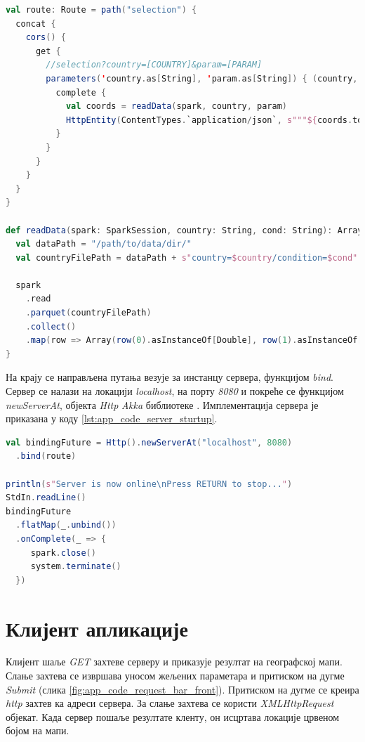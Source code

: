 \documentclass[12pt,oneside]{memoir}
\begin{document}
\begin{lstlisting}[caption={Имплементација функције која прима и обрађује \textit{GET} захтев}, language=Scala, label={lst:app_code_create_get}]
val route: Route = path("selection") {
  concat {
    cors() {
      get {
        //selection?country=[COUNTRY]&param=[PARAM]
        parameters('country.as[String], 'param.as[String]) { (country, param) =>
          complete {
            val coords = readData(spark, country, param)
            HttpEntity(ContentTypes.`application/json`, s"""${coords.toJson}""")
          }
        }
      }
    }
  }
}

def readData(spark: SparkSession, country: String, cond: String): Array[Array[Double]] = {
  val dataPath = "/path/to/data/dir/"
  val countryFilePath = dataPath + s"country=$country/condition=$cond"

  spark
    .read
    .parquet(countryFilePath)
    .collect()
    .map(row => Array(row(0).asInstanceOf[Double], row(1).asInstanceOf[Double]))
}
\end{lstlisting}

На крају се направљена путања везује за инстанцу сервера, функцијом \textit{bind}. Сервер се налази на локацији \textit{localhost}, на порту \textit{8080} и покреће се функцијом \textit{newServerAt}, објекта \textit{Http} \textit{Akka} библиотеке \cite{using_akka_http}. Имплементација сервера је приказана у коду \ref{lst:app_code_server_sturtup}.

\begin{lstlisting}[caption={Имплементација сервера}, language=Scala, label={lst:app_code_server_sturtup}]
val bindingFuture = Http().newServerAt("localhost", 8080)
  .bind(route)

println(s"Server is now online\nPress RETURN to stop...")
StdIn.readLine()
bindingFuture
  .flatMap(_.unbind())
  .onComplete(_ => {
     spark.close()
     system.terminate()
  })
\end{lstlisting}


\section{Клијент апликације}
\label{sec:app_client}

Клијент шаље \textit{GET} захтеве серверу и приказује резултат на географској мапи. Слање захтева се извршава уносом жељених параметара и притиском на дугме \textit{Submit} (слика \ref{fig:app_code_request_bar_front}). Притиском на дугме се креира \textit{http} захтев ка адреси сервера. За слање захтева се користи \textit{XMLHttpRequest} објекат. Када сервер пошаље резултате кленту, он исцртава локације црвеном бојом на мапи.
\end{document}
